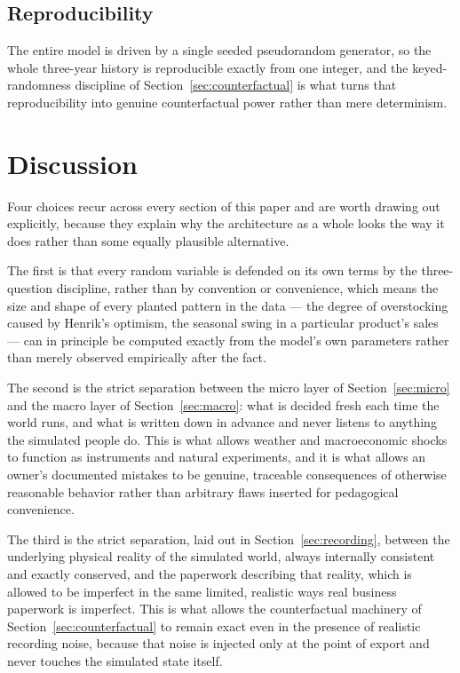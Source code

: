 \documentclass[12pt,a4paper]{article}
\begin{document}
\subsection{Reproducibility}

The entire model is driven by a single seeded pseudorandom generator, so
the whole three-year history is reproducible exactly from one integer,
and the keyed-randomness discipline of Section~\ref{sec:counterfactual}
is what turns that reproducibility into genuine counterfactual power
rather than mere determinism.

\section{Discussion}
\label{sec:discussion}

Four choices recur across every section of this paper and are worth
drawing out explicitly, because they explain why the architecture as a
whole looks the way it does rather than some equally plausible
alternative.

The first is that every random variable is defended on its own terms by
the three-question discipline, rather than by convention or
convenience, which means the size and shape of every planted pattern in
the data --- the degree of overstocking caused by Henrik's optimism, the
seasonal swing in a particular product's sales --- can in principle be
computed exactly from the model's own parameters rather than merely
observed empirically after the fact.

The second is the strict separation between the micro layer of
Section~\ref{sec:micro} and the macro layer of Section~\ref{sec:macro}:
what is decided fresh each time the world runs, and what is written down
in advance and never listens to anything the simulated people do. This
is what allows weather and macroeconomic shocks to function as
instruments and natural experiments, and it is what allows an owner's
documented mistakes to be genuine, traceable consequences of otherwise
reasonable behavior rather than arbitrary flaws inserted for pedagogical
convenience.

The third is the strict separation, laid out in
Section~\ref{sec:recording}, between the underlying physical reality of
the simulated world, always internally consistent and exactly conserved,
and the paperwork describing that reality, which is allowed to be
imperfect in the same limited, realistic ways real business paperwork
is imperfect. This is what allows the counterfactual machinery of
Section~\ref{sec:counterfactual} to remain exact even in the presence of
realistic recording noise, because that noise is injected only at the
point of export and never touches the simulated state itself.
\end{document}
